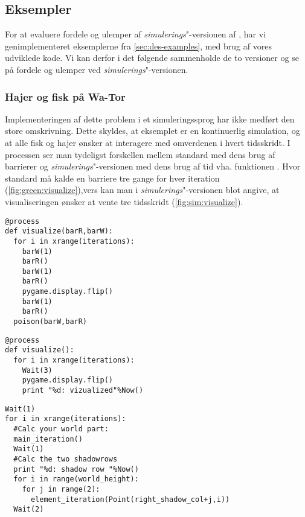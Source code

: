 \subsection{Eksempler}
For at evaluere fordele og ulemper af \emph{simulerings}"-versionen af \pycsp, har vi genimplementeret eksemplerne fra \cref{sec:des-examples}, med  brug af vores udviklede kode. Vi kan derfor i det følgende sammenholde de to versioner og se på fordele og ulemper ved \emph{simulerings}"-versionen.
 
\subsubsection{Hajer og fisk på Wa-Tor}
Implementeringen af dette problem  i et simuleringssprog har ikke medført den store omskrivning. Dette skyldes, at eksemplet er en kontinuerlig simulation, og at alle fisk og hajer ønsker at interagere med omverdenen i hvert tidsskridt. I processen  ser man tydeligst forskellen mellem standard \pycsp med dens brug af barrierer og \emph{simulerings}"-versionen med dens brug af tid vha. funktionen . Hvor standard \pycsp må kalde en barriere tre gange for hver iteration (\cref{fig:green:visualize}),vers kan man i \emph{simulerings}"-versionen blot angive, at visualiseringen ønsker at vente tre tidsskridt (\cref{fig:sim:visualize}). 

\begin{lstlisting}[firstnumber=157 ,float=hbtp, label=fig:green:visualize, caption=\code{Greenlets}"-versionen af visualize]
@process
def visualize(barR,barW):
  for i in xrange(iterations):
    barW(1)
    barR()
    barW(1)
    barR()
    pygame.display.flip()
    barW(1)
    barR()
  poison(barW,barR)     
\end{lstlisting}

\begin{lstlisting}[firstnumber=144 ,float=hbtp, label=fig:sim:visualize, caption=\code{simulerings}"-versionen af visualize]
@process
def visualize():
  for i in xrange(iterations):
    Wait(3)  
    pygame.display.flip()
    print "%d: vizualized"%Now()
\end{lstlisting}

\begin{lstlisting}[firstnumber=130 ,float=hbtp, label=fig:sim:worker, caption=Uddrag af arbejderprocessen i simulering]
Wait(1)
for i in xrange(iterations):
  #Calc your world part:
  main_iteration()
  Wait(1)
  #Calc the two shadowrows
  print "%d: shadow row "%Now()
  for i in range(world_height):
    for j in range(2):
      element_iteration(Point(right_shadow_col+j,i))
  Wait(2)
\end{lstlisting}

